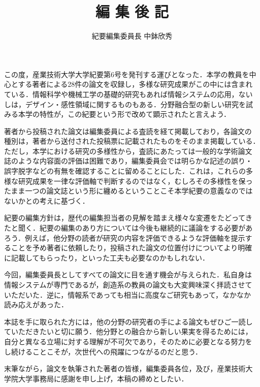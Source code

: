 \documentclass[a4j,twoside]{jarticle}
\title{編 集 後 記}
\author{紀要編集委員長 中鉢欣秀}
\date{}
\begin{document}
\pagestyle{empty}
\maketitle

この度，産業技術大学大学紀要第6号を発刊する運びとなった．本学の教員を中
心とする著者による28件の論文を収録し，多様な研究成果がこの中には含まれ
ている．情報科学や機械工学の基礎的研究もあれば情報システムの応用，ない
しは，デザイン・感性領域に関するものもある．分野融合型の新しい研究を試
みる本学の特性が，この紀要という形で改めて顕示されたと言えよう．

著者から投稿された論文は編集委員による査読を経て掲載しており，各論文の
種別は，著者から送付された投稿票に記載されたものをそのまま掲載している．
ただし，本学における研究の多様性から，査読にあたっては一般的な学術論文
誌のような内容面の評価は困難であり，編集委員会では明らかな記述の誤り・
誤字脱字などの有無を確認することに留めることにした．これは，これらの多
様な研究成果を一律な評価軸で判断するのではなく，むしろその多様性を保っ
たまま一つの論文誌という形に纏めるということこそ本学紀要の意義なのでは
ないかとの考えに基づく．

紀要の編集方針は，歴代の編集担当者の見解を踏まえ様々な変遷をたどってき
たと聞く．紀要の編集のあり方については今後も継続的に議論をする必要があ
ろう．例えば，他分野の読者が研究の内容を評価できるような評価軸を提示す
ることを予め著者に依頼したり，投稿された論文の位置付けについてより明確
に記載してもらったり，といった工夫も必要なのかもしれない．

今回，編集委員長としてすべての論文に目を通す機会が与えられた．私自身は
情報システムが専門であるが，創造系の教員の論文も大変興味深く拝読させて
いただいた．逆に，情報系であっても相当に高度なご研究もあって，なかなか
読み応えがあった．

本誌を手に取られた方には，他の分野の研究者の手による論文もぜひご一読し
ていただきたいと切に願う．他分野との融合から新しい果実を得るためには，
自分と異なる立場に対する理解が不可欠であり，そのために必要となる努力を
し続けることこそが，次世代への飛躍につながるのだと思う．

末筆ながら，論文を執筆された著者の皆様，編集委員各位，及び，産業技術大
学院大学事務局に感謝を申し上げ，本稿の締めとしたい．
\end{document}
